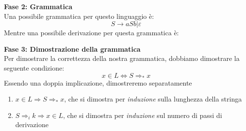 \documentclass[a4paper,oneside]{scrbook}
\newcommand{\blue}[1]{\textcolor{blue}{#1}}
\begin{document}
\textbf{Fase 2: Grammatica}\\
Una possibile grammatica per questo linguaggio è:
$$S \rightarrow aSb|\varepsilon$$
Mentre una possibile derivazione per questa grammatica è:
\begin{center}
\end{center}
\textbf{Fase 3: Dimostrazione della grammatica}\\
Per dimostrare la correttezza della nostra grammatica, dobbiamo dimostrare la seguente condizione:
$$x\in L \Leftrightarrow S \Rightarrow_* x$$
Essendo una doppia implicazione, dimostreremo separatamente
\begin{enumerate}
	\item $x\in L \Rightarrow S \Rightarrow_* x $, che si dimostra per \textit{induzione} sulla lunghezza della stringa
	\item $ S \Rightarrow_i k \Rightarrow x \in L$, che si dimostra per \textit{induzione} sul numero di passi di derivazione
\end{enumerate}
\end{document}
